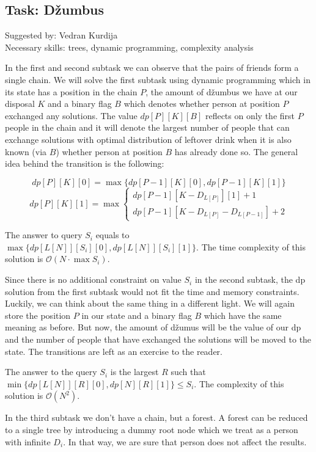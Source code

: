 \documentclass[a4paper]{article}
\begin{document}
\subsection*{Task: Džumbus}
\textsf{Suggested by: Vedran Kurdija}\\
\textsf{Necessary skills: trees, dynamic programming, complexity analysis}

In the first and second subtask we can observe that the pairs of friends form
a single chain. We will solve the first subtask using dynamic programming which
in its state has a position in the chain $P$, the amount of džumbus we have at
our disposal $K$ and a binary flag $B$ which denotes whether person at position
$P$ exchanged any solutions. The value $dp[P][K][B]$ reflects on only the first
$P$ people in the chain and it will denote the largest number of people that can
exchange solutions with optimal distribution of leftover drink when it is also
known (via $B$) whether person at position $B$ has already done so. The general
idea behind the transition is the following:

$$dp[P][K][0] = \max \{ dp[P - 1][K][0], dp[P - 1][K][1] \}$$
$$
dp[P][K][1] = \max
\begin{cases}
   dp[P - 1][K - D_{L[P]}][1] + 1 \\
   dp[P - 1][K - D_{L[P]} - D_{L[P - 1]}] + 2
\end{cases}
$$

The answer to query $S_i$ equals to $\max \{dp[L[N]][S_i][0], dp[L[N]][S_i][1]\}$.
The time complexity of this solution is $\mathcal{O}(N \cdot \max S_i)$.

Since there is no additional constraint on value $S_i$ in the second subtask,
the dp solution from the first subtask would not fit the time and memory
constraints. Luckily, we can think about the same thing in a different light. We
will again store the position $P$ in our state and a binary flag $B$ which have
the same meaning as before. But now, the amount of džumus will be the value of
our dp and the number of people that have exchanged the solutions will be moved
to the state. The transitions are left as an exercise to the reader.

The answer to the query $S_i$ is the largest $R$ such that
$\min \{dp[L[N]][R][0], dp[N][R][1]\} \le S_i$. The complexity of this
solution is $\mathcal{O}(N^2)$.

In the third subtask we don't have a chain, but a forest. A forest can be reduced
to a single tree by introducing a dummy root node which we treat as a person with
infinite $D_i$. In that way, we are sure that person does not affect the results.
\end{document}
